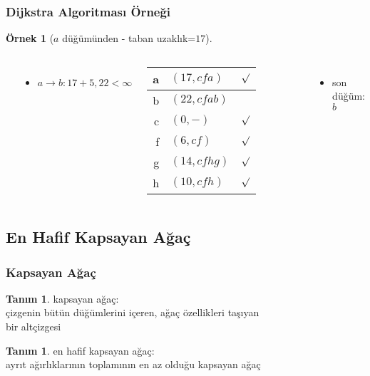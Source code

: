 \documentclass[dvipsnames]{beamer}
\theoremstyle{definition}
\newtheorem{tanim}[theorem]{Tanım}
\theoremstyle{example}
\newtheorem{ornek}[theorem]{Örnek}
\theoremstyle{plain}
\begin{document}
\begin{frame}
  \frametitle{Dijkstra Algoritması Örneği}

  \begin{ornek}[$a$ düğümünden - taban uzaklık=$17$]
    \begin{columns}
      \begin{center}
      \end{center}

      \begin{itemize}
        \item $a \rightarrow b: 17+5, 22 < \infty$
      \end{itemize}

      \pause
      \begin{table}
        \begin{tabular}{r|l|c}
          a & $(17,cfa)$   & $\surd$ \\\hline
          b & $(22,cfab)$  & \\\hline
          c & $(0,-)$      & $\surd$ \\\hline
          f & $(6,cf)$     & $\surd$ \\\hline
          g & $(14,cfhg)$  & $\surd$ \\\hline
          h & $(10,cfh)$   & $\surd$
        \end{tabular}
      \end{table}

      \pause
      \begin{itemize}
        \item son düğüm: $b$
      \end{itemize}
    \end{columns}
  \end{ornek}
\end{frame}

\subsection{En Hafif Kapsayan Ağaç}

\begin{frame}
  \frametitle{Kapsayan Ağaç}

  \begin{tanim}
    \alert{kapsayan ağaç}:\\
    çizgenin bütün düğümlerini içeren, ağaç özellikleri taşıyan\\
    bir altçizgesi
  \end{tanim}

  \pause
  \begin{tanim}
    \alert{en hafif kapsayan ağaç}:\\
    ayrıt ağırlıklarının toplamının en az olduğu kapsayan ağaç
  \end{tanim}
\end{frame}
\end{document}
